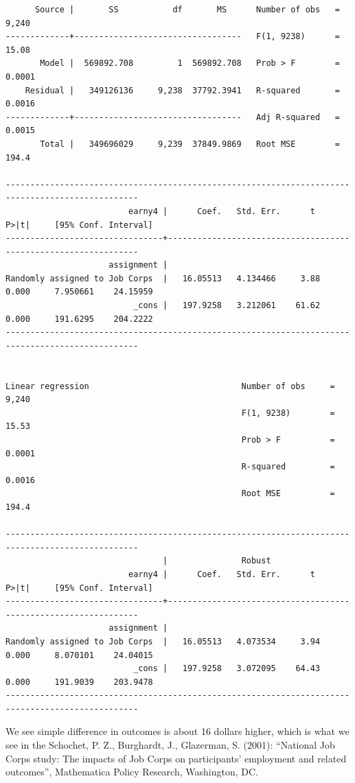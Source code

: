 \documentclass[
]{book}
\begin{document}
\begin{verbatim}
      Source |       SS           df       MS      Number of obs   =     9,240
-------------+----------------------------------   F(1, 9238)      =     15.08
       Model |  569892.708         1  569892.708   Prob > F        =    0.0001
    Residual |   349126136     9,238  37792.3941   R-squared       =    0.0016
-------------+----------------------------------   Adj R-squared   =    0.0015
       Total |   349696029     9,239  37849.9869   Root MSE        =     194.4

-------------------------------------------------------------------------------------------------
                         earny4 |      Coef.   Std. Err.      t    P>|t|     [95% Conf. Interval]
--------------------------------+----------------------------------------------------------------
                     assignment |
Randomly assigned to Job Corps  |   16.05513   4.134466     3.88   0.000     7.950661    24.15959
                          _cons |   197.9258   3.212061    61.62   0.000     191.6295    204.2222
-------------------------------------------------------------------------------------------------


Linear regression                               Number of obs     =      9,240
                                                F(1, 9238)        =      15.53
                                                Prob > F          =     0.0001
                                                R-squared         =     0.0016
                                                Root MSE          =      194.4

-------------------------------------------------------------------------------------------------
                                |               Robust
                         earny4 |      Coef.   Std. Err.      t    P>|t|     [95% Conf. Interval]
--------------------------------+----------------------------------------------------------------
                     assignment |
Randomly assigned to Job Corps  |   16.05513   4.073534     3.94   0.000     8.070101    24.04015
                          _cons |   197.9258   3.072095    64.43   0.000     191.9039    203.9478
-------------------------------------------------------------------------------------------------
\end{verbatim}

We see simple difference in outcomes is about 16 dollars higher, which is what we see in the Schochet, P. Z., Burghardt, J., Glazerman, S. (2001): ``National Job Corps study: The impacts of Job Corps on participants' employment and related outcomes'', Mathematica Policy Research, Washington, DC.
\end{document}
